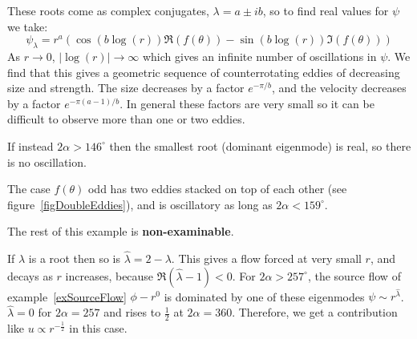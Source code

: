 \documentclass[../Main.tex]{subfiles}
\begin{document}
\begin{example}
    These roots come as complex conjugates, $\lambda = a \pm ib$, so to find real values for $\psi$ we take:
    \begin{equation*}
        \psi_\lambda = r^a\left(\cos(b\log(r)) \Re(f(\theta)) - \sin(b\log(r))\Im(f(\theta))\right)
    \end{equation*}
    As $r \to 0$, $|\log(r)| \to \infty$ which gives an infinite number of oscillations in $\psi$. We find that this gives a geometric sequence of counterrotating eddies of decreasing size and strength. The size decreases by a factor $e^{-\pi / b}$, and the velocity decreases by a factor $e^{-\pi(a-1) / b}$. In general these factors are very small so it can be difficult to observe more than one or two eddies.

    If instead $2\alpha > 146^\circ$ then the smallest root (dominant eigenmode) is real, so there is no oscillation.

    The case $f(\theta)$ odd has two eddies stacked on top of each other (see figure~\ref{figDoubleEddies}), and is oscillatory as long as $2\alpha < 159^\circ$.

    The rest of this example is \textbf{non-examinable}.

    If $\lambda$ is a root then so is $\hat \lambda = 2-\lambda$. This gives a flow forced at very small $r$, and decays as $r$ increases, because $\Re(\hat\lambda - 1) < 0$. For $2\alpha > 257^\circ$, the source flow of example~\ref{exSourceFlow} $\phi - r^0$ is dominated by one of these eigenmodes $\psi \sim r^{\hat \lambda}$. $\hat \lambda = 0$ for $2\alpha = 257$ and rises to $\frac12$ at $2\alpha = 360$. Therefore, we get a contribution like $u \propto r^{-\frac12}$ in this case.
\end{example}
\end{document}
